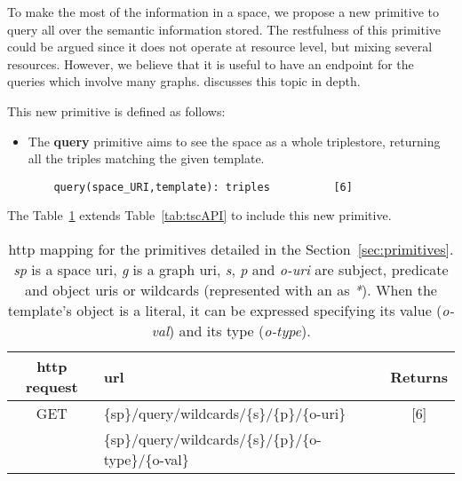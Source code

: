 To make the most of the information in a space, we propose a new primitive to query all over the semantic information stored.
The \ac{rest}fulness of this primitive could be argued since it does not operate at resource level,
but mixing several resources.
However, we believe that it is useful to have an endpoint for the queries which involve many graphs.
\citet{kjernsmo_necessity_2012} discusses this topic in depth. %

This new primitive is defined as follows:
\begin{itemize}
  \item The \textbf{query} primitive aims to see the space as a whole triplestore, returning all the triples matching the given template.
  
  \begin{lstlisting}
    query(space_URI,template): triples          [6]
  \end{lstlisting}
\end{itemize}


The Table~\ref{tab:queryAPI} extends Table~\ref{tab:tscAPI} to include this new primitive.

\begin{table} %
  \centering
  \caption {
    \acs{http} mapping for the primitives detailed in the Section~\ref{sec:primitives}. \textit{sp} is a space \acs{uri},
    \textit{g} is a graph \acs{uri}, \textit{s}, \textit{p} and \textit{o-uri} are subject, predicate and object \acsp{uri} or wildcards (represented with an as \textit{*}).
    When the template's object is a literal, it can be expressed specifying its value (\textit{o-val}) and its type (\textit{o-type}).
    \medskip
  }
  \begin{tabular}{c|l|c}
      \acs{http} request & \acs{url} & Returns \\
      \hline
      GET & \{sp\}/query/wildcards/\{s\}/\{p\}/\{o-uri\} &  [6] \\
      & \{sp\}/query/wildcards/\{s\}/\{p\}/\{o-type\}/\{o-val\} & \\
  \end{tabular}
  \label{tab:queryAPI}
\end{table}


